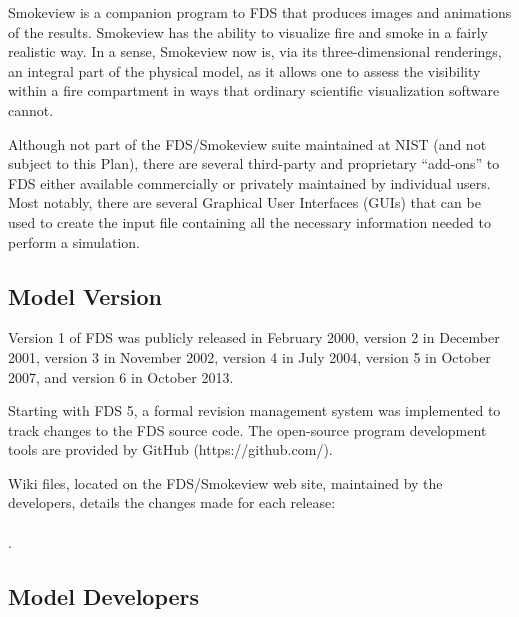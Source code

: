 \documentclass[11pt]{book}
\begin{document}
Smokeview is a companion program to FDS that produces images and animations of the results. Smokeview has the ability to visualize fire and smoke in a fairly realistic way. In a sense, Smokeview now is, via its three-dimensional renderings,
an integral part of the physical model, as it allows one to assess the visibility within a fire compartment in ways that ordinary scientific
visualization software cannot.

Although not part of the FDS/Smokeview suite maintained at NIST (and not subject to this Plan), there are several third-party and proprietary ``add-ons'' to FDS either available
commercially or privately maintained by individual users. Most notably, there are several Graphical User Interfaces (GUIs) that can be used to create
the input file containing all the necessary information needed to perform a simulation.



\subsection{Model Version}

Version 1 of FDS was publicly released in February 2000, version 2 in December 2001, version 3 in November 2002, version 4 in July 2004, version 5 in October 2007, and version 6 in October 2013.

Starting with FDS 5, a formal revision management system was implemented to track changes to the FDS source code. The open-source program development tools are provided by GitHub (https://github.com/).

Wiki files, located on the FDS/Smokeview web site, maintained by the developers, details the changes made for each release: \\ \href{https://github.com/firemodels/fds/wiki/Release-Notes}{} \\ \href{https://github.com/firemodels/smv/wiki/Release-Notes}{}.


\subsection{Model Developers}
\end{document}
